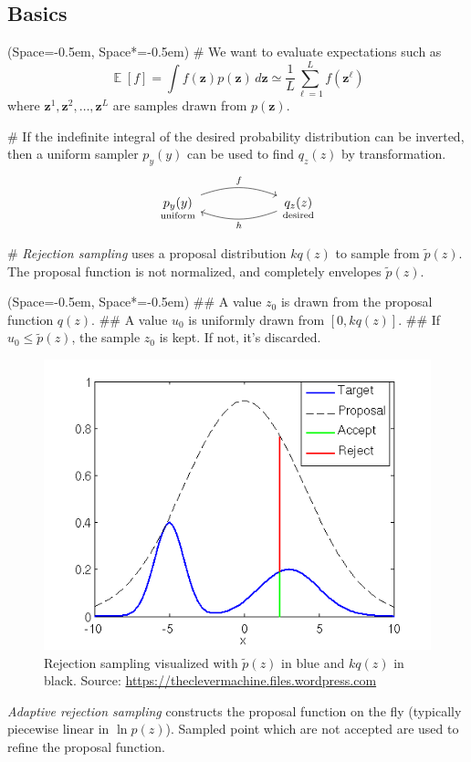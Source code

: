 \documentclass[12pt, a4paper]{article}
\newcommand{\listSpace}{-0.5em}%
\newcommand{\vect}[1]{\bm{#1}}
\DeclareMathOperator{\E}{\mathbb{E}}
\begin{document}
\subsection*{Basics}
\begin{easylist}[itemize]
	\ListProperties(Space=\listSpace, Space*=\listSpace)
	# We want to evaluate expectations such as
	\begin{equation*}
		\E \left[ f \right] =
		\int f(\vect{z}) p (\vect{z}) \, d \vect{z}
		\simeq 
		\frac{1}{L} \sum_{\ell = 1}^{L} f \left( \vect{z}^{\ell}\right)
	\end{equation*}
	where $\vect{z}^{1}, \vect{z}^{2}, \ldots, \vect{z}^{L}$ are samples drawn from $p(\vect{z})$.
	
	# If the indefinite integral of the desired probability distribution can be inverted, then a uniform sampler $p_y(y)$ can be used to find $q_z(z)$
	by transformation.
	\[\begin{tikzcd}[column sep=6em]
	\underset{\text{uniform}}{p_y(y)} \arrow[bend left = 20]{r}{f} & \underset{\text{desired}}{q_z(z)} \arrow[ bend left = 20]{l}{h}
	\end{tikzcd}\]
	
	# \emph{Rejection sampling} uses a proposal distribution $kq(z)$ to sample from $\widetilde{p}(z)$.
	The proposal function is not normalized, and completely envelopes $\widetilde{p}(z)$.
	
	\begin{easylist}[enumerate]
		\ListProperties(Space=\listSpace, Space*=\listSpace)
	## A value $z_0$ is drawn from the proposal function $q(z)$.
	## A value $u_0$ is uniformly drawn from $\left[0, kq(z)\right]$.
	## If $u_0 \leq \widetilde{p}(z)$, the sample $z_0$ is kept.
	   If not, it's discarded.
	\end{easylist}

	
		\begin{figure}[ht!]
			\centering
			\includegraphics[width=0.5\linewidth]{figs/rejection.png}
			\caption{Rejection sampling visualized with $\widetilde{p}(z)$ in blue and $kq(z)$ in black.
				Source: \url{https://theclevermachine.files.wordpress.com}}
			\label{fig:rejection}
		\end{figure}
		
		\emph{Adaptive rejection sampling} constructs the proposal function on the fly (typically piecewise linear in $\ln p(z)$).
		Sampled point which are not accepted are used to refine the proposal function.
		
	\end{easylist}
\end{document}
